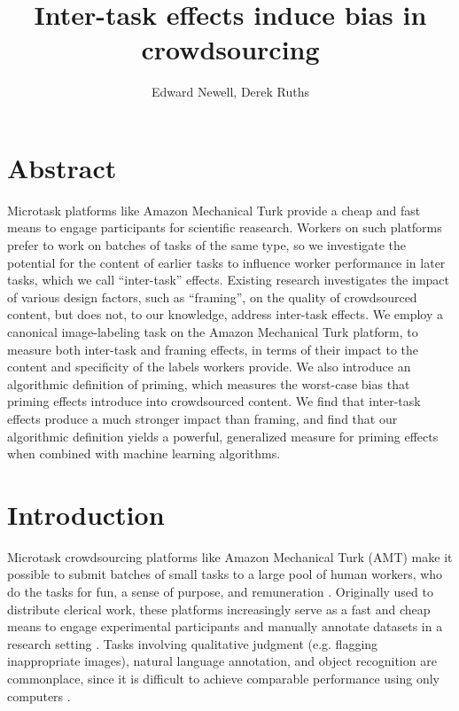 \documentclass[letterpaper,twocolumn]{article}
\title{Inter-task effects induce bias in crowdsourcing}
\author{Edward Newell, Derek Ruths}
\begin{document}
\maketitle
\section*{Abstract}
Microtask platforms like Amazon Mechanical Turk provide a cheap and fast means
to engage participants for scientific reasearch.  
Workers on such platforms prefer to work on batches of tasks of the same 
type, so we investigate the potential for the content of earlier tasks 
to influence worker performance in later tasks, which we call ``inter-task'' 
effects.  
Existing research investigates the impact of various design factors, such as 
``framing'', on the quality of crowdsourced content, but does not, to 
our knowledge, address inter-task effects.  
We employ a canonical image-labeling task on the Amazon Mechanical Turk 
platform, to measure both inter-task and framing effects, in terms of their 
impact to the content and specificity of the labels workers provide.
We also introduce an algorithmic definition of priming, which measures the 
worst-case bias that priming effects introduce into crowdsourced content.
We find that inter-task effects produce a much stronger impact than framing, 
and find that our algorithmic definition yields a powerful, generalized measure
for priming effects when combined with machine learning algorithms.


\section*{Introduction}

Microtask crowdsourcing platforms like Amazon Mechanical Turk (AMT) make it 
possible to submit batches of small tasks to a large pool of human workers, 
who do the tasks for fun, a sense of purpose, and remuneration 
\cite{kazai2013analysis, Antin20122925}.  
Originally used to distribute clerical work, these platforms 
increasingly serve as a fast and cheap means to engage experimental 
participants and manually annotate datasets in a research 
setting \cite{snow2008cheap}.  
Tasks involving qualitative
judgment (e.g. flagging inappropriate images), natural language annotation,
and object recognition are commonplace, since it is difficult to achieve 
comparable performance using only computers \cite{yuen2011survey}.
\end{document}
